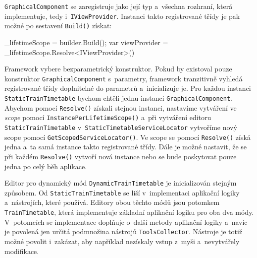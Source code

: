 \begin{csharpcode}
public class CoreModule : Module {

  protected override void Load(ContainerBuilder builder) {

   builder
	.RegisterType<GraphicalComponent>()
	.AsSelf()
	.AsImplementedInterfaces()
	.InstancePerLifetimeScope();
	
/*...*/
\end{csharpcode}

\texttt{GraphicalComponent} se zaregistruje jako její typ a~všechna rozhraní, která implementuje, tedy i~\texttt{IViewProvider}. Instanci takto registrované třídy je pak možné po sestavení \texttt{Build()} získat:

\begin{csharpcode}
_lifetimeScope = builder.Build();
var viewProvider = _lifetimeScope.Resolve<IViewProvider>()
\end{csharpcode}

Framework vybere bezparametrický konstruktor. Pokud by existoval pouze konstruktor \texttt{GraphicalComponent} s~parametry, framework tranzitivně vyhledá registrované třídy doplnitelné do parametrů a~inicializuje je. Pro každou instanci \texttt{StaticTrainTimetable} bychom chtěli jednu instanci \texttt{GraphicalComponent}. \linebreak Abychom pomocí \texttt{Resolve()} získali stejnou instanci, nastavíme vytváření ve \textit{scope} pomocí \texttt{InstancePerLifetimeScope()} a~při vytváření editoru \linebreak \texttt{StaticTrainTimetable} v~\texttt{StaticTimetableServiceLocator} vytvoříme nový \linebreak scope pomocí \texttt{GetScopedServiceLocator()}. Ve scope  se pomocí \texttt{Resolve()} získá jedna a~ta samá instance takto registrované třídy. Dále je možné nastavit, že se při každém \texttt{Resolve()} vytvoří nová instance nebo se bude poskytovat pouze jedna po celý běh aplikace.

Editor pro dynamický mód \texttt{DynamicTrainTimetable} je inicializován stejným způsobem. Od \texttt{StaticTrainTimetable} se liší v~implementaci aplikační logiky a~nástrojích, které používá. Editory obou těchto módů jsou potomkem \linebreak \texttt{TrainTimetable}, která implementuje základní aplikační logiku pro oba dva \linebreak módy. V~potomcích se implementace doplňuje o~další metody aplikační logiky a~navíc je povolená jen určitá podmnožina nástrojů \texttt{ToolsCollector}. Nástroje je totiž možné povolit i~zakázat, aby například nezískaly vstup z~myši a~nevytvářely modifikace.

